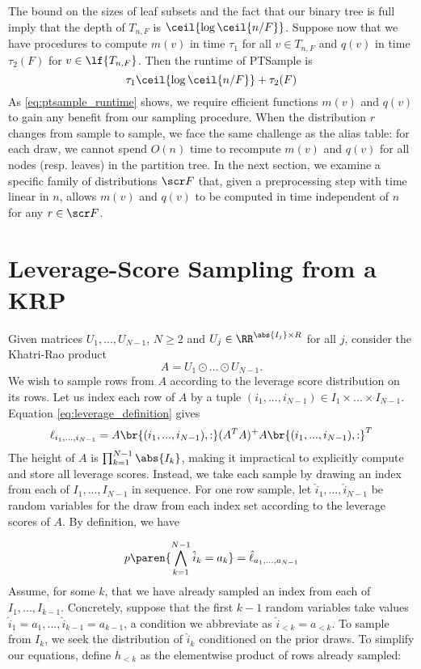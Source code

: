 The bound on the sizes of leaf subsets and the fact that our binary tree is full 
imply that the depth of $T_{n, F}$ is $\ceil{\log \ceil{n/F}}$. Suppose now that we have 
procedures to compute $m(v)$ in time $\tau_1$ for all $v \in T_{n, F}$ and 
$q(v)$ in time $\tau_2(F)$ for $v \in \lf{T_{n, F}}$. Then the runtime 
of PTSample is 
\begin{equation}
\tau_1 \ceil{\log \ceil{n/F}} + \tau_2(F)
\label{eq:ptsample_runtime}
\end{equation}
As \ref{eq:ptsample_runtime} shows, we require efficient functions
$m(v)$ and $q(v)$ to gain any benefit from our sampling
procedure. When the distribution $r$ changes from sample to sample, we 
face the same challenge as the alias table: for each draw, 
we cannot spend $O(n)$ time to recompute $m(v)$ and $q(v)$ for
all nodes (resp. leaves) in the partition tree. In the next section,
we examine a specific family of distributions $\scr F$ that, given a
preprocessing step with time linear in $n$, allows $m(v)$ and
$q(v)$ to be computed in time independent of $n$ for any 
$r \in \scr F$.

\section{Leverage-Score Sampling from a KRP}
\label{sec:krp_leverage_defs}
Given matrices $U_1, ..., U_{N-1}$, $N \geq 2$ and $U_j \in \RR^{\abs{I_j} \times R}$ for all $j$, consider the Khatri-Rao product 
$$A = U_1 \odot ... \odot U_{N-1}.$$
We wish to sample rows from $A$
according to the leverage score distribution on its rows. Let us 
index each row of $A$ by a tuple $(i_1, ..., i_{N-1}) \in
I_1 \times ... \times I_{N-1}$.
Equation \ref{eq:leverage_definition} gives
\begin{equation}
\ell_{i_1, ..., i_{N-1}} = 
A \br{(i_1, ..., i_{N-1}), :} (A^T 
A)^+ A \br{(i_1, ..., i_{N-1}), :}^T
\label{eq:krp_leverage}
\end{equation}
The height of $A$ is $\prod_{k=1}^{N-1} \abs{I_k}$, making
it impractical to explicitly compute and store all leverage scores.
Instead, we take each sample by drawing an index from each of 
$I_1, ..., I_{N-1}$ in sequence. For one row sample,
let $\hat i_1, ..., \hat i_{N-1}$ be random variables for 
the draw from each index set according to the leverage scores of
$A$. By definition, we have

\begin{equation}
p \paren{\bigwedge_{k=1}^{N-1} \hat i_k = a_k} = \hat \ell_{a_1, ..., a_{N-1}}
\label{eq:idx_rv_def}
\end{equation}
Assume, for some $k$, that we have already sampled an index 
from each of $I_1, ..., I_{k-1}$. Concretely, suppose that 
the first $k-1$ random variables take values 
$\hat i_1 = a_1, ..., \hat i_{k-1} = a_{k-1}$, a condition
we abbreviate as $\hat i_{< k} = a_{< k}$. 
To sample from $I_k$, we seek the distribution of 
$\hat i_k$ conditioned on the prior draws. To simplify our 
equations, define $h_{< k}$ as the elementwise product of rows 
already sampled:

